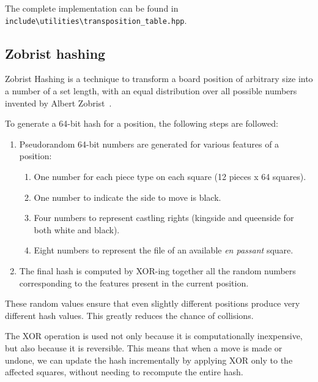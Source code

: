 \vspace{1em}

\noindent \parbox{\textwidth}{The complete implementation can be found in\\\texttt{include\textbackslash{}utilities\textbackslash{}transposition\_table.hpp}.}

\newpage

\subsection*{Zobrist hashing}

Zobrist Hashing is a technique to transform a board position of arbitrary size into a number of a set length, with an equal distribution over all possible numbers invented by Albert Zobrist~\cite{ZobristHashing}.

\vspace{1em}

\noindent To generate a 64-bit hash for a position, the following steps are followed:

\begin{enumerate}
  \item Pseudorandom 64-bit numbers are generated for various features of a position:
  \begin{enumerate}
    \item One number for each piece type on each square (12 pieces x 64 squares).
    \item One number to indicate the side to move is black.
    \item Four numbers to represent castling rights (kingside and queenside for both white and black).
    \item Eight numbers to represent the file of an available \textit{en passant} square.
  \end{enumerate}
  \item The final hash is computed by XOR-ing together all the random numbers corresponding to the features present in the current position.
\end{enumerate}

\noindent These random values ensure that even slightly different positions produce very different hash values. This greatly reduces the chance of collisions.

\vspace{1em}

\noindent The XOR operation is used not only because it is computationally inexpensive, but also because it is reversible. This means that when a move is made or undone, we can update the hash incrementally by applying XOR only to the affected squares, without needing to recompute the entire hash.

